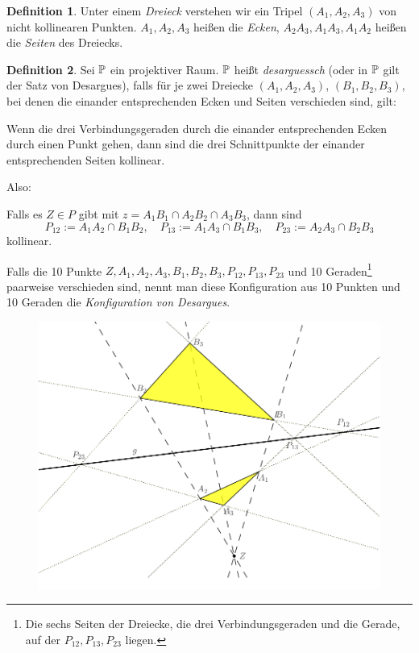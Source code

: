 \documentclass[
 a4paper,
 12pt,
 parskip=half
 ]{scrartcl}
\theoremstyle{plain}
\theoremstyle{definition}
\newtheorem*{defn*}{Definition}
\begin{document}
\begin{defn*}
 Unter einem \emph{Dreieck} verstehen wir ein Tripel $(A_1, A_2, A_3)$ von nicht kollinearen Punkten. $A_1, A_2, A_3$ heißen die \emph{Ecken}, $A_2 A_3, A_1 A_3, A_1 A_2$ heißen die \emph{Seiten} des Dreiecks.
\end{defn*}

\begin{defn*}
 Sei $\mathbb{P}$ ein projektiver Raum. $\mathbb{P}$ heißt \emph{desarguessch} (oder in $\mathbb{P}$ gilt der Satz von Desargues), falls für je zwei Dreiecke $(A_1, A_2, A_3)$, $(B_1, B_2, B_3)$, bei denen die einander entsprechenden Ecken und Seiten verschieden sind, gilt: 
 \begin{addmargin}[.5cm]{0cm}
 Wenn die drei Verbindungsgeraden durch die einander entsprechenden Ecken durch einen Punkt gehen, dann sind die drei Schnittpunkte der einander entsprechenden Seiten kollinear. 
 \end{addmargin}
 Also:
 \begin{addmargin}[.5cm]{0cm}
 Falls es $Z \in P$ gibt mit $z = A_1 B_1 \cap A_2 B_2 \cap A_3 B_3$, dann sind
 \[ P_{12} := A_1 A_2 \cap B_1 B_2, \quad P_{13} := A_1 A_3 \cap B_1 B_3, \quad P_{23} := A_2 A_3 \cap B_2 B_3 \]
 kollinear.
 \end{addmargin}

 Falls die 10 Punkte $Z, A_1, A_2, A_3, B_1, B_2, B_3, P_{12}, P_{13}, P_{23}$ und 10 Geraden\footnote{Die sechs Seiten der Dreiecke, die drei Verbindungsgeraden und die Gerade, auf der $P_{12}, P_{13}, P_{23}$ liegen.}  paarweise verschieden sind, nennt man diese Konfiguration aus 10 Punkten und 10 Geraden die \emph{Konfiguration von Desargues}.
\end{defn*}

\begin{figure}[ht]
 \center
 \includegraphics[width=12cm]{img/desargues}
\end{figure}
\end{document}

